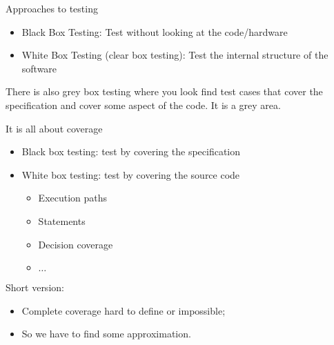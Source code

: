 \documentclass[handout]{beamer}
\begin{document}
\begin{frame}{Approaches to testing}
  \begin{itemize}
  \item Black Box Testing: Test without looking at the code/hardware
  \item White Box Testing (clear box testing):  Test the internal
    structure of the software
  \end{itemize}
  There is also grey box testing where you look find test cases that cover the
  specification and cover some aspect of the code.  It is a grey area.  
\end{frame}
\begin{frame}{It is all about coverage}
  \begin{itemize}
  \item Black box testing: test by covering the specification
  \item White box testing: test by covering the source code
    \begin{itemize}
    \item Execution paths
    \item Statements
    \item Decision coverage
    \item $\ldots$
    \end{itemize}
  \end{itemize}
  Short version:
  \begin{itemize}
  \item  Complete coverage hard to define or impossible;
  \item  So we have to find some approximation.
  \end{itemize}
\end{frame}
\end{document}
